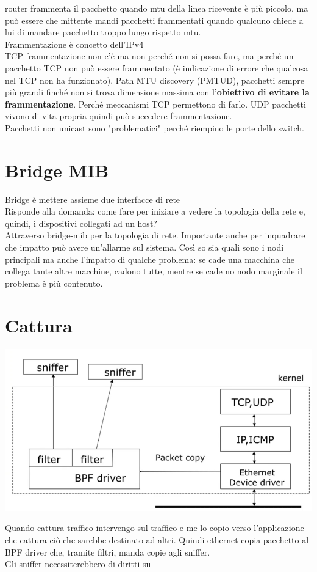\documentclass[10pt]{book}
\begin{document}
router frammenta il pacchetto quando mtu della linea ricevente è più piccolo. ma può essere che mittente mandi pacchetti frammentati quando qualcuno chiede a lui di mandare pacchetto troppo lungo rispetto mtu.\\
Frammentazione è concetto dell'IPv4\\
TCP frammentazione non c'è ma non perché non si possa fare, ma perché un pacchetto TCP non può essere frammentato (è indicazione di errore che qualcosa nel TCP non ha funzionato). Path MTU discovery (PMTUD), pacchetti sempre più grandi finché non si trova dimensione massima con l'\textbf{obiettivo di evitare la frammentazione}. Perché meccanismi TCP permettono di farlo. UDP pacchetti vivono di vita propria quindi può succedere frammentazione.\\
Pacchetti non unicast sono "problematici" perché riempino le porte dello switch.
\chapter{Bridge MIB}
Bridge è mettere assieme due interfacce di rete\\
Risponde alla domanda: come fare per iniziare a vedere la topologia della rete e, quindi, i dispositivi collegati ad un host?\\
Attraverso bridge-mib per la topologia di rete. Importante anche per inquadrare che impatto può avere un'allarme sul sistema. Così so sia quali sono i nodi principali ma anche l'impatto di qualche problema: se cade una macchina che collega tante altre macchine, cadono tutte, mentre se cade no nodo marginale il problema è più contenuto.
\chapter{Cattura}
\begin{center}
	\includegraphics[scale=0.75]{cattura.png}
\end{center}
Quando cattura traffico intervengo sul traffico e me lo copio verso l'applicazione che cattura ciò che sarebbe destinato ad altri. Quindi ethernet copia pacchetto al BPF driver che, tramite filtri, manda copie agli sniffer.\\
Gli sniffer necessiterebbero di diritti su
\end{document}
